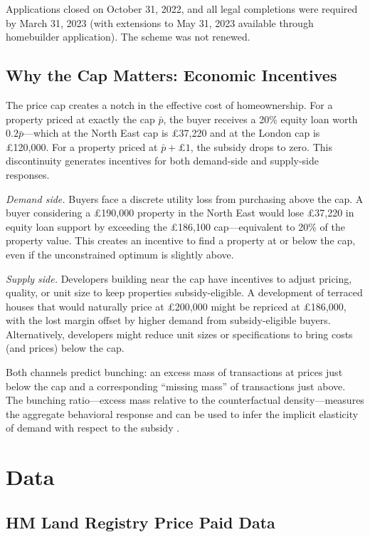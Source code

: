 \documentclass[12pt]{article}
\begin{document}
Applications closed on October 31, 2022, and all legal completions were required by March 31, 2023 (with extensions to May 31, 2023 available through homebuilder application). The scheme was not renewed.

\subsection{Why the Cap Matters: Economic Incentives}

The price cap creates a notch in the effective cost of homeownership. For a property priced at exactly the cap $\bar{p}$, the buyer receives a 20\% equity loan worth $0.2\bar{p}$---which at the North East cap is \pounds37,220 and at the London cap is \pounds120,000. For a property priced at $\bar{p} + \pounds1$, the subsidy drops to zero. This discontinuity generates incentives for both demand-side and supply-side responses.

\textit{Demand side.} Buyers face a discrete utility loss from purchasing above the cap. A buyer considering a \pounds190,000 property in the North East would lose \pounds37,220 in equity loan support by exceeding the \pounds186,100 cap---equivalent to 20\% of the property value. This creates an incentive to find a property at or below the cap, even if the unconstrained optimum is slightly above.

\textit{Supply side.} Developers building near the cap have incentives to adjust pricing, quality, or unit size to keep properties subsidy-eligible. A development of terraced houses that would naturally price at \pounds200,000 might be repriced at \pounds186,000, with the lost margin offset by higher demand from subsidy-eligible buyers. Alternatively, developers might reduce unit sizes or specifications to bring costs (and prices) below the cap.

Both channels predict bunching: an excess mass of transactions at prices just below the cap and a corresponding ``missing mass'' of transactions just above. The bunching ratio---excess mass relative to the counterfactual density---measures the aggregate behavioral response and can be used to infer the implicit elasticity of demand with respect to the subsidy \citep{kleven2016bunching}.


\section{Data}\label{sec:data}

\subsection{HM Land Registry Price Paid Data}
\end{document}
